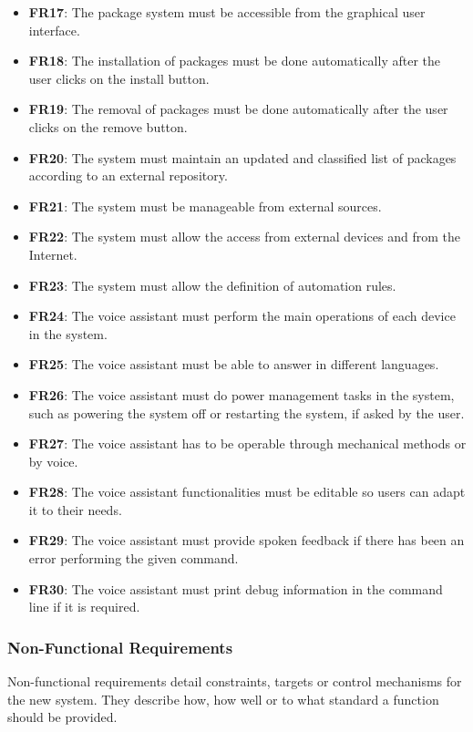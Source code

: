 \begin{itemize}
    \item \textbf{FR17}: The package system must be accessible from the graphical user interface.
    \item \textbf{FR18}: The installation of packages must be done automatically after the user clicks on the install button.
    \item \textbf{FR19}: The removal of packages must be done automatically after the user clicks on the remove button.
    \item \textbf{FR20}: The system must maintain an updated and classified list of packages according to an external repository.
    \item \textbf{FR21}: The system must be manageable from external sources.
    \item \textbf{FR22}: The system must allow the access from external devices and from the Internet.
    \item \textbf{FR23}: The system must allow the definition of automation rules.
    \item \textbf{FR24}: The voice assistant must perform the main operations of each device in the system.
    \item \textbf{FR25}: The voice assistant must be able to answer in different languages.
    \item \textbf{FR26}: The voice assistant must do power management tasks in the system, such as powering the system
    off or restarting the system, if asked by the user.
    \item \textbf{FR27}: The voice assistant has to be operable through mechanical methods or by voice.
    \item \textbf{FR28}: The voice assistant functionalities must be editable so users can adapt it to their needs.
    \item \textbf{FR29}: The voice assistant must provide spoken feedback if there has been an error performing the given command.
    \item \textbf{FR30}: The voice assistant must print debug information in the command line if it is required.
\end{itemize}

\subsubsection{Non-Functional Requirements}
Non-functional requirements detail constraints, targets or control mechanisms for the new system. They describe how, how well or
to what standard a function should be provided.\cite{sqaFunctionalNonFunctional}

